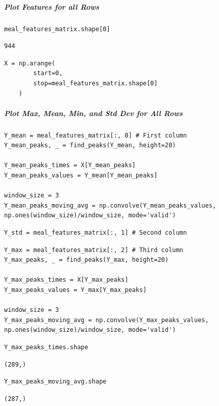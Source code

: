 \subparagraph{Plot Features for all Rows}

\begin{verbatim}
meal_features_matrix.shape[0]
\end{verbatim}

\begin{verbatim}
944
\end{verbatim}

\begin{verbatim}
X = np.arange(
        start=0,
        stop=meal_features_matrix.shape[0]
    )
\end{verbatim}

\subparagraph{Plot Max, Mean, Min, and Std Dev for All Rows}

\begin{verbatim}
Y_mean = meal_features_matrix[:, 0] # First column
Y_mean_peaks, _ = find_peaks(Y_mean, height=20)

Y_mean_peaks_times = X[Y_mean_peaks]
Y_mean_peaks_values = Y_mean[Y_mean_peaks]

window_size = 3
Y_mean_peaks_moving_avg = np.convolve(Y_mean_peaks_values, np.ones(window_size)/window_size, mode='valid')
\end{verbatim}

\begin{verbatim}
Y_std = meal_features_matrix[:, 1] # Second column
\end{verbatim}

\begin{verbatim}
Y_max = meal_features_matrix[:, 2] # Third column
Y_max_peaks, _ = find_peaks(Y_max, height=20)

Y_max_peaks_times = X[Y_max_peaks]
Y_max_peaks_values = Y_max[Y_max_peaks]

window_size = 3
Y_max_peaks_moving_avg = np.convolve(Y_max_peaks_values, np.ones(window_size)/window_size, mode='valid')
\end{verbatim}

\begin{verbatim}
Y_max_peaks_times.shape
\end{verbatim}

\begin{verbatim}
(289,)
\end{verbatim}

\begin{verbatim}
Y_max_peaks_moving_avg.shape
\end{verbatim}

\begin{verbatim}
(287,)
\end{verbatim}

